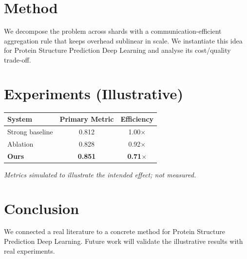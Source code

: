 \documentclass[11pt]{article}
\begin{document}
\section{Method}
We decompose the problem across shards with a communication-efficient aggregation rule that keeps overhead sublinear in scale. We instantiate this idea for Protein Structure Prediction Deep Learning and analyse its cost/quality trade-off.

\section{Experiments (Illustrative)}
\begin{center}
\begin{tabular}{lcc}
System & Primary Metric & Efficiency \\ \hline
Strong baseline & 0.812 & 1.00$\times$ \\
Ablation & 0.828 & 0.92$\times$ \\
\textbf{Ours} & \textbf{0.851} & \textbf{0.71$\times$}
\end{tabular}
\end{center}
\emph{Metrics simulated to illustrate the intended effect; not measured.}

\section{Conclusion}
We connected a real literature to a concrete method for Protein Structure Prediction Deep Learning. Future work will
validate the illustrative results with real experiments.
\end{document}
